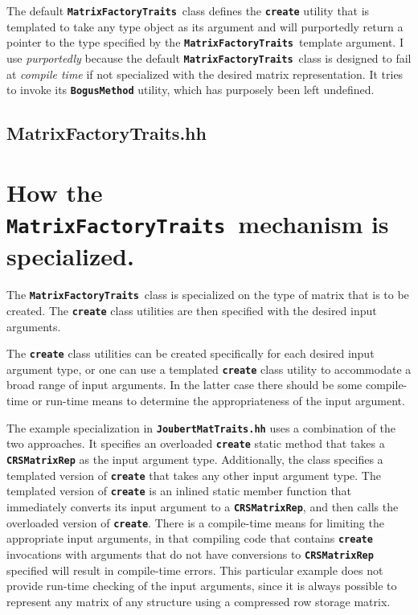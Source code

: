 \documentclass[11pt]{nmemo}
\newcommand{\cxxcode}{\color{codecolor}}
\newcommand{\code}[1]{\textbf{\texttt{\textcolor{codecolor}{#1}}}}
\newcommand{\MFT}{\code{Matrix\-Factory\-Traits}\ }
\begin{document}
The default \MFT class defines the \code{create} utility that is
templated to take any type object as its
argument and will purportedly return a pointer to the type specified
by the \MFT template argument.
I use \emph{purportedly} because the default \MFT class is designed
to fail at \emph{compile time}
if not specialized with the desired matrix representation.
It tries to invoke its \code{BogusMethod} utility, which has purposely
been left undefined.

\subsection{MatrixFactoryTraits.hh}

\begin{ttfamily}
\begin{small}
\cxxcode

\end{small}
\end{ttfamily}

\section{How the \MFT mechanism is specialized.}

The \MFT class is specialized on the type of matrix that is to be created.
The \code{create} class utilities are then specified with the desired input
arguments.

The \code{create} class utilities can be created specifically for each desired
input argument type, or one can use a templated \code{create} class utility
to accommodate a broad range of input arguments.
In the latter case there should be some compile-time or run-time means
to determine the appropriateness of the input argument.

The example specialization in \code{JoubertMatTraits.hh} uses a combination
of the two approaches.
It specifies an overloaded \code{create} static method that takes a
\code{CRSMatrixRep} as the
input argument type.
Additionally, the class specifies a templated version of \code{create}
that takes any other input argument type.
The templated version of \code{create} is an inlined static member function
that immediately converts its input argument to a \code{CRSMatrixRep}, and
then calls the overloaded version of \code{create}.
There is a compile-time means for limiting the appropriate input arguments, in
that compiling code that contains \code{create} invocations with
arguments that do not have conversions to \code{CRSMatrixRep} specified
will result in compile-time errors.
This particular example does not provide run-time checking of the input
arguments, since it is always possible to represent any matrix of any
structure using a compressed row storage matrix.
\end{document}
